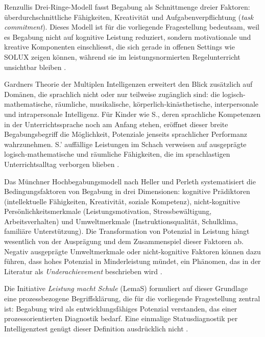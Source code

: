 \documentclass[ngerman, a4paper]{article}
\begin{document}
Renzullis Drei-Ringe-Modell fasst Begabung als Schnittmenge dreier Faktoren:
überdurchschnittliche Fähigkeiten, Kreativität und Aufgabenverpflichtung
(\textit{task commitment}). Dieses Modell ist für die vorliegende Fragestellung bedeutsam,
weil es Begabung nicht auf kognitive Leistung reduziert, sondern motivationale und
kreative Komponenten einschliesst, die sich gerade in offenen Settings wie SOLUX zeigen
können, während sie im leistungsnormierten Regelunterricht unsichtbar bleiben
\parencite{muelleroppliger2021handbuch}.

Gardners Theorie der Multiplen Intelligenzen erweitert den Blick zusätzlich auf Domänen,
die sprachlich nicht oder nur teilweise zugänglich sind: die logisch-mathematische,
räumliche, musikalische, körperlich-kinästhetische, interpersonale und intrapersonale
Intelligenz. Für Kinder wie S., deren sprachliche Kompetenzen in der Unterrichtssprache
noch am Anfang stehen, eröffnet dieser breite Begabungsbegriff die Möglichkeit, Potenziale
jenseits sprachlicher Performanz wahrzunehmen. S.' auffällige Leistungen im Schach
verweisen auf ausgeprägte logisch-mathematische und räumliche Fähigkeiten, die im
sprachlastigen Unterrichtsalltag verborgen blieben \parencite{trautmann2016einfuehrung}.

Das Münchner Hochbegabungsmodell nach Heller und Perleth systematisiert die
Bedingungsfaktoren von Begabung in drei Dimensionen: kognitive Prädiktoren
(intellektuelle Fähigkeiten, Kreativität, soziale Kompetenz), nicht-kognitive
Persönlichkeitsmerkmale (Leistungsmotivation, Stressbewältigung, Arbeitsverhalten) und
Umweltmerkmale (Instruktionsqualität, Schulklima, familiäre Unterstützung). Die
Transformation von Potenzial in Leistung hängt wesentlich von der Ausprägung und dem
Zusammenspiel dieser Faktoren ab. Negativ ausgeprägte Umweltmerkmale oder
nicht-kognitive Faktoren können dazu führen, dass hohes Potenzial in Minderleistung
mündet, ein Phänomen, das in der Literatur als \textit{Underachievement} beschrieben wird
\parencite{preckel2013hochbegabung,fischer2020begabungsfoerderung}.

Die Initiative \textit{Leistung macht Schule} (LemaS) formuliert auf dieser
Grundlage eine prozessbezogene Begriffsklärung, die für die vorliegende
Fragestellung zentral ist: Begabung wird als entwicklungsfähiges Potenzial
verstanden, das einer prozessorientierten Diagnostik bedarf. Eine einmalige
Statusdiagnostik per Intelligenztest genügt dieser Definition ausdrücklich
nicht \parencite{lemas2023begriffsklaerung}.
\end{document}
